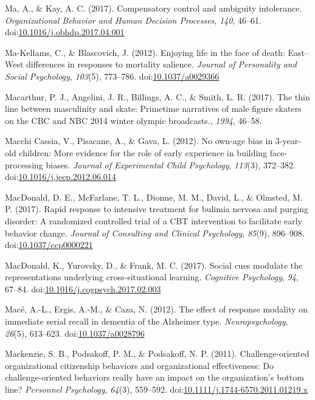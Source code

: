 \documentclass[english,man]{apa6}
\begin{document}
\hypertarget{ref-Ma2017}{}
Ma, A., \& Kay, A. C. (2017). Compensatory control and ambiguity
intolerance. \emph{Organizational Behavior and Human Decision
Processes}, \emph{140}, 46--61.
doi:\href{https://doi.org/10.1016/j.obhdp.2017.04.001}{10.1016/j.obhdp.2017.04.001}

\hypertarget{ref-Ma-Kellams2012}{}
Ma-Kellams, C., \& Blascovich, J. (2012). Enjoying life in the face of
death: East--West differences in responses to mortality salience.
\emph{Journal of Personality and Social Psychology}, \emph{103}(5),
773--786. doi:\href{https://doi.org/10.1037/a0029366}{10.1037/a0029366}

\hypertarget{ref-Macarthur2017}{}
Macarthur, P. J., Angelini, J. R., Billings, A. C., \& Smith, L. R.
(2017). The thin line between masculinity and skate: Primetime
narratives of male figure skaters on the CBC and NBC 2014 winter olympic
broadcasts., \emph{1994}, 46--58.

\hypertarget{ref-MacchiCassia2012}{}
Macchi Cassia, V., Pisacane, A., \& Gava, L. (2012). No own-age bias in
3-year-old children: More evidence for the role of early experience in
building face-processing biases. \emph{Journal of Experimental Child
Psychology}, \emph{113}(3), 372--382.
doi:\href{https://doi.org/10.1016/j.jecp.2012.06.014}{10.1016/j.jecp.2012.06.014}

\hypertarget{ref-MacDonald2017a}{}
MacDonald, D. E., McFarlane, T. L., Dionne, M. M., David, L., \&
Olmsted, M. P. (2017). Rapid response to intensive treatment for bulimia
nervosa and purging disorder: A randomized controlled trial of a CBT
intervention to facilitate early behavior change. \emph{Journal of
Consulting and Clinical Psychology}, \emph{85}(9), 896--908.
doi:\href{https://doi.org/10.1037/ccp0000221}{10.1037/ccp0000221}

\hypertarget{ref-MacDonald2017}{}
MacDonald, K., Yurovsky, D., \& Frank, M. C. (2017). Social cues
modulate the representations underlying cross-situational learning.
\emph{Cognitive Psychology}, \emph{94}, 67--84.
doi:\href{https://doi.org/10.1016/j.cogpsych.2017.02.003}{10.1016/j.cogpsych.2017.02.003}

\hypertarget{ref-Mace2012}{}
Macé, A.-L., Ergis, A.-M., \& Caza, N. (2012). The effect of response
modality on immediate serial recall in dementia of the Alzheimer type.
\emph{Neuropsychology}, \emph{26}(5), 613--623.
doi:\href{https://doi.org/10.1037/a0028796}{10.1037/a0028796}

\hypertarget{ref-Mackenzie2011}{}
Mackenzie, S. B., Podsakoff, P. M., \& Podsakoff, N. P. (2011).
Challenge-oriented organizational citizenship behaviors and
organizational effectiveness: Do challenge-oriented behaviors really
have an impact on the organization's bottom line? \emph{Personnel
Psychology}, \emph{64}(3), 559--592.
doi:\href{https://doi.org/10.1111/j.1744-6570.2011.01219.x}{10.1111/j.1744-6570.2011.01219.x}
\end{document}
